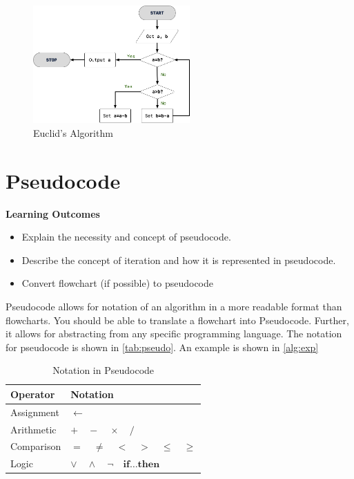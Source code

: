 \begin{figure}[ht]
\centering
\includegraphics[width=6cm]{euclid}
\caption{Euclid's Algorithm}\label{fig:euclid}
\end{figure}

\section{Pseudocode}

\begin{mdframed}
\textbf{Learning Outcomes}
\begin{itemize}[label={\checkmark}]
\item Explain the necessity and concept of pseudocode.
\item Describe the concept of iteration and how it is represented in pseudocode.
\item Convert flowchart (if possible) to pseudocode

\end{itemize}
\end{mdframed}

Pseudocode allows for notation of an algorithm in a more readable format than flowcharts. You should be able to translate a flowchart into Pseudocode. Further, it allows for abstracting from any specific programming language. The notation for pseudocode is shown in \autoref{tab:pseudo}. An example is shown in \autoref{alg:exp}

\begin{table}[ht]
\centering
\begin{tabular}{p{}p{}}
\toprule
\textbf{Operator}  & \textbf{Notation} \\ \midrule
Assignment & \( \leftarrow \) \\
Arithmetic &  \(+ \quad - \quad \times \quad / \) \\
Comparison & \(= \quad \neq \quad < \quad > \quad \leq \quad \geq \) \\
Logic & \( \vee \quad \wedge \quad \neg \quad \mathbf{if \ldots then}\) \\
\bottomrule
\end{tabular}
\caption{Notation in Pseudocode}\label{tab:pseudo}
\end{table}

